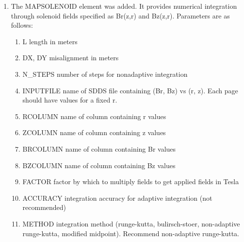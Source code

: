 \documentclass[11pt]{article}
\begin{document}
\begin{enumerate}
\item The MAPSOLENOID element was added.  It provides numerical integration 
through solenoid fields specified as Br(z,r) and Bz(z,r).  Parameters
are as follows:
\begin{enumerate}
\item L               length in meters
\item DX, DY          misalignment in meters
\item N\_STEPS         number of steps for nonadaptive integration
\item INPUTFILE       name of SDDS file containing (Br, Bz) vs (r, z).  
                Each page should have values for a fixed r.
\item RCOLUMN         name of column containing r values
\item ZCOLUMN         name of column containing z values
\item BRCOLUMN        name of column containing Br values
\item BZCOLUMN        name of column containing Bz values
\item FACTOR          factor by which to multiply fields to get applied fields in Tesla
\item ACCURACY        integration accuracy for adaptive integration (not recommended)
\item METHOD          integration method (runge-kutta, bulirsch-stoer, non-adaptive 
                runge-kutta, modified midpoint).  Recommend non-adaptive runge-kutta.
\end{enumerate}


\end{enumerate}
\end{document}
